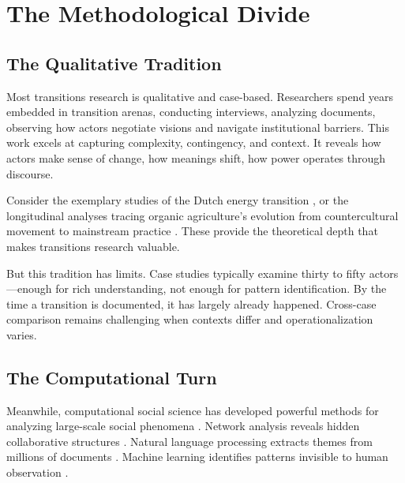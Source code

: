 \documentclass[../main.tex]{subfiles}
\begin{document}
\section{The Methodological Divide}
\label{sec:intro:divide}

\subsection{The Qualitative Tradition}

Most transitions research is qualitative and case-based. Researchers spend years embedded in transition arenas, conducting interviews, analyzing documents, observing how actors negotiate visions and navigate institutional barriers. This work excels at capturing complexity, contingency, and context. It reveals how actors make sense of change, how meanings shift, how power operates through discourse.

Consider the exemplary studies of the Dutch energy transition \cite{verbong2007dutch}, or the longitudinal analyses tracing organic agriculture's evolution from countercultural movement to mainstream practice \cite{smith2006organic}. These provide the theoretical depth that makes transitions research valuable.

But this tradition has limits. Case studies typically examine thirty to fifty actors---enough for rich understanding, not enough for pattern identification. By the time a transition is documented, it has largely already happened. Cross-case comparison remains challenging when contexts differ and operationalization varies.

\subsection{The Computational Turn}

Meanwhile, computational social science has developed powerful methods for analyzing large-scale social phenomena \cite{lazer2009computational,salganik2019bitbybit,grimmer2021mlsocialscience}. Network analysis reveals hidden collaborative structures \cite{newman2010networks,borgatti2009network}. Natural language processing extracts themes from millions of documents \cite{grimmer2013text}. Machine learning identifies patterns invisible to human observation \cite{molina2019machine}.
\end{document}
